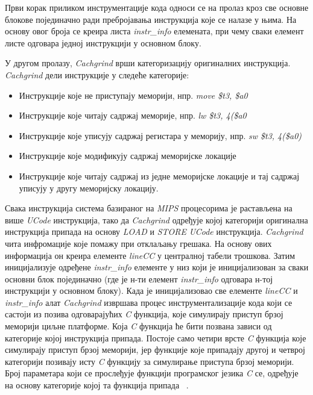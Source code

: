 \documentclass[12pt,oneside]{memoir}
\begin{document}
\indent Први корак приликом инструментације кода односи се на пролаз кроз све основне блокове појединачно ради пребројавања инструкција које се налазе у њима. На основу овог броја се креира листа \textit{instr\_info} елемената, при чему сваки елемент листе одговара једној инструкцији у основном блоку.

\indent У другом пролазу, \textit{Cachgrind} врши категоризацију оригиналних инструкција. \textit{Cachgrind} дели инструкције у следеће категорије:

\begin{itemize}
  \item Инструкције које не приступају меморији, нпр. \textit{move \$t3, \$a0}
  \item Инструкције које читају садржај меморије, нпр. \textit{lw \$t3, 4(\$a0}
  \item Инструкције које уписују садржај регистара у меморију, нпр. \textit{sw \$t3, 4(\$a0)}
  \item Инструкције које модификују садржај меморијске локације
  \item Инструкције које читају садржај из једне меморијске локације и тај садржај уписују у другу меморијску локацију.
\end{itemize}

\indent Свака инструкција система базираног на \textit{MIPS} процесорима је растављена на више \textit{UCode} инструкција, тако да \textit{Cachgrind} одређује којој категорији оригинална инструкција припада на основу \textit{LOAD} и \textit{STORE} \textit{UCode} инструкција. \textit{Cachgrind} чита инфромације које помажу при отклаљању грешака. На основу ових информација он креира елементе \textit{lineCC} у централној табели трошкова. Затим иницијализује одређене \textit{instr\_info} елементе у  низ који је иницијализован за сваки основни блок појединачно (где је н-ти елемент \textit{instr\_info} одговара н-тој инструкцији у основном блоку). Када је иницијализовао све елементе \textit{lineCC} и \textit{instr\_info} алат \textit{Cachgrind} извршава процес инструментализације кода који се састоји из позива одговарајућих \textit{C} функција, које симулирају приступ брзој меморији циљне платформе. Која \textit{C} функција ће бити позвана зависи од категорије којој инструкција припада. Постоје само четири врсте \textit{C} функција које симулирају приступ брзој меморији, јер функције које припадају другој и четврој категорији позивају исту \textit{C} функцију за симулирање приступа брзој меморији. Број параметара који се прослеђује функцији програмског језика \textit{C} се, одређује на основу категорије којој та функција припада ~\cite{cachegrindRef}.
\end{document}

